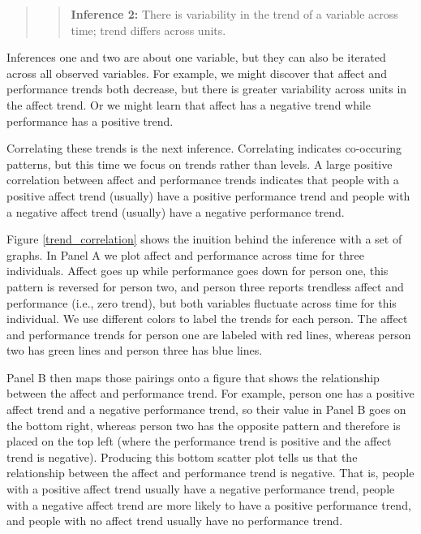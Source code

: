 \documentclass[english,,man]{apa6}
\theoremstyle{definition}
\theoremstyle{definition}
\theoremstyle{definition}
\theoremstyle{remark}
\begin{document}
\begin{quote}
\begin{quote}
\textbf{Inference 2:} There is variability in the trend of a variable
across time; trend differs across units.
\end{quote}
\end{quote}

Inferences one and two are about one variable, but they can also be
iterated across all observed variables. For example, we might discover
that affect and performance trends both decrease, but there is greater
variability across units in the affect trend. Or we might learn that
affect has a negative trend while performance has a positive trend.

Correlating these trends is the next inference. Correlating indicates
co-occuring patterns, but this time we focus on trends rather than
levels. A large positive correlation between affect and performance
trends indicates that people with a positive affect trend (usually) have
a positive performance trend and people with a negative affect trend
(usually) have a negative performance trend.

Figure \ref{trend_correlation} shows the inuition behind the inference
with a set of graphs. In Panel A we plot affect and performance across
time for three individuals. Affect goes up while performance goes down
for person one, this pattern is reversed for person two, and person
three reports trendless affect and performance (i.e., zero trend), but
both variables fluctuate across time for this individual. We use
different colors to label the trends for each person. The affect and
performance trends for person one are labeled with red lines, whereas
person two has green lines and person three has blue lines.

Panel B then maps those pairings onto a figure that shows the
relationship between the affect and performance trend. For example,
person one has a positive affect trend and a negative performance trend,
so their value in Panel B goes on the bottom right, whereas person two
has the opposite pattern and therefore is placed on the top left (where
the performance trend is positive and the affect trend is negative).
Producing this bottom scatter plot tells us that the relationship
between the affect and performance trend is negative. That is, people
with a positive affect trend usually have a negative performance trend,
people with a negative affect trend are more likely to have a positive
performance trend, and people with no affect trend usually have no
performance trend.
\end{document}
